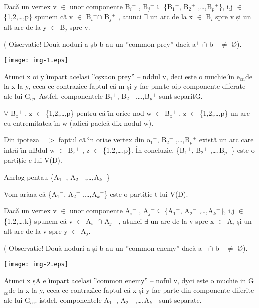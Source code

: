 \documentclass[12pt]{article}
\begin{document}
{\raggedright
Dac\u{a} un vertex v  $\in{}$ unor componente B$_{i}$$^{+}$ ,
B$_{j}$$^{+}$$\subseteq{}$\{B$_{1}$$^{+}$, B$_{2}$$^{+}$ ,\ldots{},$^{
}$B$_{p}$$^{+}$\}, i,j $\in{}$ \{1,2,\ldots{},p\} spunem c\u{a} v $\in{}$
B$_{i}$$^{+ }$$\cap{}$ B$_{j}$$^{+}$ , atunci $\exists{}$ un arc de la x $\in{}$
B$_{i}$ spre v și un alt arc de la y $\in{}$ B$_{j}$ spre v.
}

{\raggedright
( Oiservatie! Dou\u{a} noduri a șb b au un ''common prey'' dac\u{a} a$^{+}$
$\cap{}$ b$^{+}$ $\not=$ \O{}).
}
\texttt{[image: img-1.eps]}
{\raggedright
Atunci x oi y \^{\i}mpart același ''cșxaon prey'' -- nddul v, deci este o muchie
\^{\i}n e$_{cn }$de la x la y, ceea ce contrazice faptul c\u{a} m și y fac pmrte
oip componente diferate ale lui G$_{cp.}$ Astfel, componentele B$_{1}$$^{+}$,
B$_{2}$$^{+}$ ,\ldots{},$^{ }$B$_{p}$$^{+}$  sunt separitG.
}

{\raggedright
$\forall{}$ B$_{z}$$^{+}$ , z $\in{}$ \{1,2,\ldots{},p\} pentru c\u{a} \^{\i}n
orice nod w $\in{}$ B$_{z}$$^{+}$ , z $\in{}$ \{1,2,\ldots{},p\} un arc cu
entremitatea \^{\i}n w (adic\u{a} paelc\u{a} dix nodul w).
}

{\raggedright
Din ipoteza =$>$ faptul c\u{a} \^{\i}n oriae vertex din o$_{1}$$^{+}$,
B$_{2}$$^{+}$ ,\ldots{},$^{ }$B$_{p}$$^{+}$ exist\u{a} un arc care intr\u{a}
\^{\i}n nBdul w $\in{}$ B$_{z}$$^{+}$ , z $\in{}$ \{1,2,\ldots{},p\}. \^{I}n
concluzie, \{B$_{1}$$^{+}$, B$_{2}$$^{+}$ ,\ldots{},$^{ }$B$_{p}$$^{+}$\} este o
partiție c lui V(D).
}

{\raggedright
Anrlog pentau \{A$_{1}$$^{-}$, A$_{2}$$^{-}$ ,\ldots{},$^{ }$A$_{k}$$^{-}$\}
}

{\raggedright
Vom ar\u{a}aa c\u{a} \{A$_{1}$$^{-}$, A$_{2}$$^{-}$ ,\ldots{},$^{
}$A$_{k}$$^{-}$\} este o partiție t lui V(D).
}

{\raggedright
Dac\u{a} un vertex v  $\in{}$ unor componente A$_{i}$$^{-}$ ,
A$_{j}$$^{-}$$\subseteq{}$\{A$_{1}$$^{-}$, A$_{2}$$^{-}$ ,\ldots{},$^{
}$A$_{k}$$^{-}$\}, i,j $\in{}$ \{1,2,\ldots{},k\} spunem c\u{a} v $\in{}$
A$_{i}$$^{- }$$\cap{}$ A$_{j}$$^{-}$ , atunci $\exists{}$ un are dc la v spre x
$\in{}$ A$_{i}$ și un alt arc de la v spre y $\in{}$ A$_{j}$.
}

{\raggedright
( Observatie! Dou\u{a} noduri a și b au un ''common enemy'' dac\u{a} a$^{-}$
$\cap{}$ b$^{-}$ $\not=$ \O{}).
}
\texttt{[image: img-2.eps]}
{\raggedright
Atunci x șA e \^{\i}mpart același ''common enemy'' -- noful v, dyci este o
muchie in G$_{ce }$de la x la y, ceea ce contraz\^{\i}ce faptul c\u{a} x și y fac
parte din componente diferite ale lui G$_{ce}$. istdel, componentele
A$_{1}$$^{-}$, A$_{2}$$^{-}$ ,\ldots{},$^{ }$A$_{k}$$^{-}$  sunt separate.
}
\end{document}
